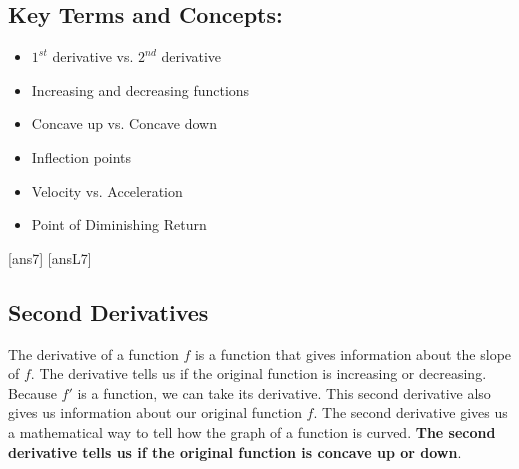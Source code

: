 \begin{framed}
\begin{itemize}
\begin{itemize}
    \end{itemize}
\end{itemize}
\subsection*{Key Terms and Concepts:} 

\begin{multicols}{2}
\begin{itemize}
    \item $1^{st}$ derivative vs. $2^{nd}$ derivative
    \item Increasing and decreasing functions
    \item Concave up vs. Concave down
    \item Inflection points
    \item Velocity vs. Acceleration
    \item Point of Diminishing Return
\end{itemize}
\end{multicols}
\end{framed}
\newpage
[ans7]
[ansL7]
\subsection*{Second Derivatives}
The derivative of a function $f$ is a function that gives information about the slope of $f$. The derivative tells us if the original function is increasing or decreasing. Because $f'$ is a function, we can take its derivative. This second derivative also gives us information about our original function $f$. The second derivative gives us a mathematical way to tell how the graph of a function is curved. \textbf{The second derivative tells us if the original function is concave up or down}.

